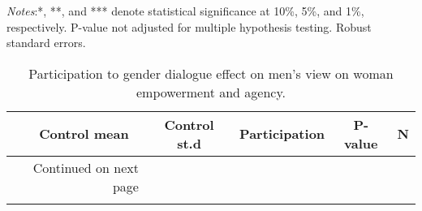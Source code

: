 \documentclass[10pt,a4paper, margin=1in]{article}
\begin{document}
\tableofcontents

\listoftables
\listoffigures

\pagebreak


\begin{center}
	{\tiny \tabcolsep=1pt  %
		\begin{ThreePartTable}
			\begin{TableNotes}[flushleft]
				\tiny
				\item \textit{Notes}:*, **, and *** denote statistical significance at 10\%, 5\%, and 1\%, respectively. P-value not adjusted for multiple hypothesis testing. Robust standard errors.
			\end{TableNotes}
			\begin{longtable}{l*{5}{c}}
				\caption{Participation to gender dialogue effect on men's view on woman empowerment and agency.}\label{tab:balance_omni}					\\
				\toprule
				\hline 
				&\multicolumn{1}{p{1cm}}{\centering Control mean}
				&\multicolumn{1}{p{1cm}}{\centering Control st.d}
				&\multicolumn{1}{p{2cm}}{\centering Participation}
				&\multicolumn{1}{p{1cm}}{\centering P-value}
				&\multicolumn{1}{p{1cm}}{\centering N} \\
				\hline 
				\endfirsthead
				\hline
				\endhead
				\hline
				\multicolumn{2}{r}{{Continued on next page}} \\
				\endfoot
				
				\bottomrule
				\insertTableNotes
				\endlastfoot
				
			\end{longtable}
		\end{ThreePartTable}
	}
\end{center}
\end{document}
